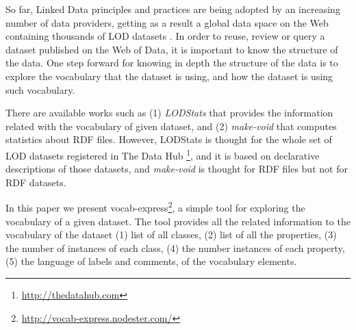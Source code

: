 So far, Linked Data principles and practices are being adopted by an increasing number of data providers, getting as a result a global data space on the Web containing thousands of LOD datasets \cite{}. In order to reuse, review or query a dataset published on the Web of Data, it is important to know the structure of the data. One step forward for knowing in depth the structure of the data is to explore the vocabulary that the dataset is using, and how the dataset is using such vocabulary.

There are available works such as (1) \emph{LODStats} \cite{} that provides the information related with the vocabulary of given dataset, and (2) \emph{make-void} \cite{} that computes statistics about RDF files. However, LODStats is thought for the whole set of LOD datasets registered in The Data Hub \footnote{\footnotesize \url{http://thedatahub.com}}, and it is based on declarative descriptions of those datasets, and \emph{make-void} is thought for RDF files but not for RDF datasets.

In this paper we present vocab-express\footnote{\footnotesize \url{http://vocab-express.nodester.com/}}, a simple tool for exploring the vocabulary of a given dataset. The tool provides all the related information to the vocabulary of the dataset (1) list of all classes, (2) list of all the properties, (3) the number of instances of each class, (4) the number instances of each property, (5) the language of labels and comments, of the vocabulary elements.


